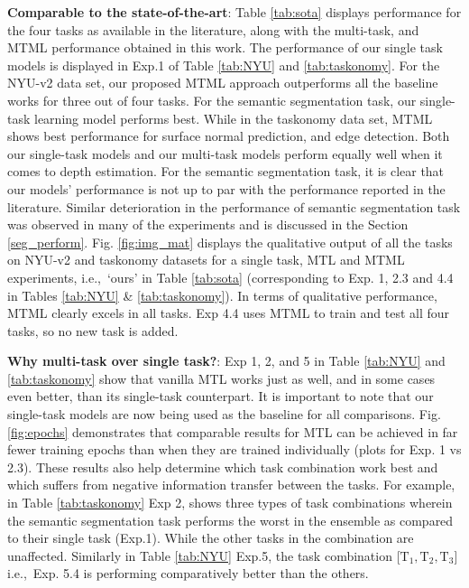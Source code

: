 \documentclass[conference]{IEEEtran}
\newcommand*{\ie}		{i.e.,\ }
\begin{document}
\textbf{Comparable to the state-of-the-art}: Table \ref{tab:sota} displays performance for the four tasks as available in the literature, along with the multi-task, and \ac{MTML} performance obtained in this work. 
The performance of our single task models is displayed in Exp.1 of Table \ref{tab:NYU} and \ref{tab:taskonomy}.
For the NYU-v2 data set, our proposed \ac{MTML} approach outperforms all the baseline works for three out of four tasks. For the semantic segmentation task, our single-task learning model performs best.
While in the taskonomy data set, \ac{MTML} shows best performance for surface normal prediction, and edge detection.
Both our single-task models and our multi-task models perform equally well when it comes to depth estimation.
For the semantic segmentation task, it is clear that our models' performance is not up to par with the performance reported in the literature. 
Similar deterioration in the performance of semantic segmentation task was observed in many of the experiments and is discussed in the Section \ref{seg_perform}.
Fig. \ref{fig:img_mat} displays the qualitative output of all the tasks on NYU-v2 and taskonomy datasets for a single task, \ac{MTL} and \ac{MTML} experiments, \ie `ours' in Table \ref{tab:sota} (corresponding to Exp. 1, 2.3 and 4.4 in Tables \ref{tab:NYU} \& \ref{tab:taskonomy}).
In terms of qualitative performance, \ac{MTML} clearly excels in all tasks.
Exp 4.4 uses \ac{MTML} to train and test all four tasks, so no new task is added.


\textbf{Why multi-task over single task?}: Exp 1, 2, and 5 in Table \ref{tab:NYU} and \ref{tab:taskonomy} show that vanilla \ac{MTL} works just as well, and in some cases even better, than its single-task counterpart.
It is important to note that our single-task models are now being used as the baseline for all comparisons.
Fig. \ref{fig:epochs} demonstrates that comparable results for \ac{MTL} can be achieved in far fewer training epochs than when they are trained individually (plots for Exp. 1 vs 2.3).
These results also help determine which task combination work best and which suffers from negative information transfer between the tasks. 
For example, in Table \ref{tab:taskonomy} Exp 2, shows three types of task combinations wherein the semantic segmentation task performs the worst in the ensemble as compared to their single task (Exp.1).
While the other tasks in the combination are unaffected.
Similarly in Table \ref{tab:NYU} Exp.5, the task combination [$\mathrm{T_1, T_2, T_3}$] \ie Exp. 5.4 is performing comparatively better than the others.
\end{document}
